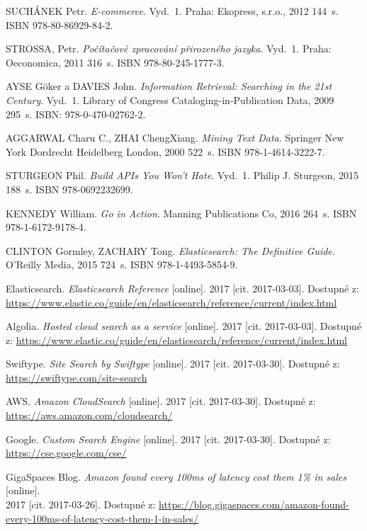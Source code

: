 \documentclass[FM,DP]{tulthesis}
\begin{document}
\begin{thebibliography}{Mm99}

 SUCHÁNEK Petr. \emph{E-commerce}.
Vyd.~1. Praha: Ekopress, s.r.o., 2012 144~s. ISBN 978-80-86929-84-2.

 STROSSA, Petr. \emph{Počítačové zpracování přirozeného jazyka}.
Vyd.~1. Praha: Oeconomica, 2011 316~s. ISBN 978-80-245-1777-3.

 AYSE Göker a DAVIES John.
\emph{Information Retrieval: Searching in the 21st Century}.
Vyd.~1. Library of Congress Cataloging-in-Publication Data, 2009 295~s. ISBN: 978-0-470-02762-2.

 AGGARWAL Charu C., ZHAI ChengXiang. \emph{Mining Text Data}.
Springer New York Dordrecht Heidelberg London, 2000 522~s. ISBN 978-1-4614-3222-7.

 STURGEON Phil. \emph{Build APIs You Won't Hate}.
Vyd.~1. Philip J. Sturgeon, 2015 188~s. ISBN 978-0692232699.

 KENNEDY William. \emph{Go in Action}.
Manning Publications Co, 2016 264~s. ISBN 978-1-6172-9178-4.

 CLINTON Gormley, ZACHARY Tong. \emph{Elasticsearch: The Definitive Guide}.
O'Reilly Media, 2015 724~s. ISBN 978-1-4493-5854-9.

 Elasticsearch. \emph{Elasticsearch Reference} [online].
2017 [cit. 2017-03-03]. Dostupné z:
\url{https://www.elastic.co/guide/en/elasticsearch/reference/current/index.html}

 Algolia. \emph{Hosted cloud search as a service} [online].
2017 [cit. 2017-03-03]. Dostupné z:
\url{https://www.elastic.co/guide/en/elasticsearch/reference/current/index.html}

 Swiftype. \emph{Site Search by Swiftype} [online].
2017 [cit. 2017-03-30]. Dostupné z: \url{https://swiftype.com/site-search}

 AWS. \emph{Amazon CloudSearch} [online].
2017 [cit. 2017-03-30]. Dostupné z: \url{https://aws.amazon.com/cloudsearch/}

 Google. \emph{Custom Search Engine} [online].
2017 [cit. 2017-03-30]. Dostupné z: \url{https://cse.google.com/cse/}

 GigaSpaces Blog.
\emph{Amazon found every 100ms of latency cost them 1\% in sales} [online]. \\
2017 [cit. 2017-03-26].
Dostupné z: \url{https://blog.gigaspaces.com/amazon-found-every-100ms-of-latency-cost-them-1-in-sales/}


\end{thebibliography}
\end{document}
